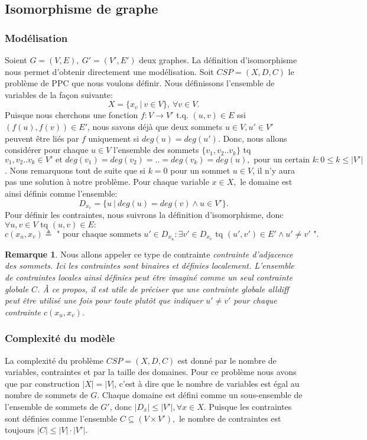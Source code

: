 \documentclass[french]{article}
\theoremstyle{definition}
\newtheorem{rem}{Remarque}[section]
\theoremstyle{remark}
\begin{document}
\subsection{Isomorphisme de graphe}
\subsubsection{Modélisation}
\label{sssec:model1}
Soient $G=(V, E),\ G'=(V', E')$ deux graphes. 
La définition d'isomorphisme nous permet d'obtenir directement une modélisation. Soit $CSP = (X, D, C)$ le problème de PPC que nous voulons définir. Nous définissons l'ensemble de variables de la façon suivante: 
$$X=\{x_v\ |\ v \in V \},\ \forall v \in V.$$
Puisque nous cherchons une fonction  $f: V \rightarrow V'$ t.q. $ (u,v) \in E$ ssi $ (f(u), f(v)) \in E'$, nous savons déjà que deux sommets $u \in V, u' \in V'$ peuvent être liés par $f$ uniquement si $deg(u) = deg(u')$. Donc, nous allons considérer pour chaque $u \in V$ l'ensemble des sommets $\{v_1, v_2..v_k\}$ tq $v_1, v_2..v_k \in V' \text{ et } deg(v_1)=deg(v_2)=..=deg(v_k)=deg(u), \text{ pour un certain } k: 0 \leq k \leq |V'|$. Nous remarquons tout de suite que si $k=0$ pour un sommet $u \in V$, il n'y aura pas une solution à notre problème. Pour chaque variable $x \in X,$ le domaine est ainsi définis comme l'ensemble: 
$$D_{x_v}=\{u\ |\ deg(u) = deg(v) \land u \in V'\}.$$
Pour définir les contraintes, nous suivrons la définition d'isomorphisme, donc $\forall u, v \in V \text{ tq } (u,v) \in E:$
$$c(x_u, x_v) \triangleq \text{ " pour chaque sommets } u' \in D_{x_u}: \exists v' \in D_{x_v} \text{ tq } (u', v') \in E' \land u' \neq v' \text{ "}.$$
\begin{rem}
	\label{rem:contraintes}
	Nous allons appeler ce type de contrainte \it contrainte d'adjacence des sommets\rm. Ici les contraintes sont binaires et définies localement. L'ensemble de contraintes locales ainsi définies peut être imaginé comme un seul contrainte globale $C$. À ce propos, il est utile de préciser que une contrainte globale \it alldiff \rm peut être utilisé une fois pour toute plutôt que indiquer $u' \neq v'$ pour chaque contrainte $c(x_u, x_v)$.
\end{rem}
\subsubsection{Complexité du modèle}
\label{subsubsec:compl1}
La complexité du problème $CSP=(X,D,C)$ est donné par le nombre de variables, contraintes et par la taille des domaines. Pour ce problème nous avons que par construction $|X|=|V|$, c'est à dire que le nombre de variables est égal au nombre de sommets de $G$. Chaque domaine est défini comme un sous-ensemble de l'ensemble de sommets de $G'$, donc $|D_x| \leq |V'|, \forall x \in X.$ Puisque les contraintes sont définies comme l'ensemble $C \subseteq (V \times V'),$ le nombre de contraintes est toujours $|C| \leq |V| \cdot |V'|.$
\end{document}

